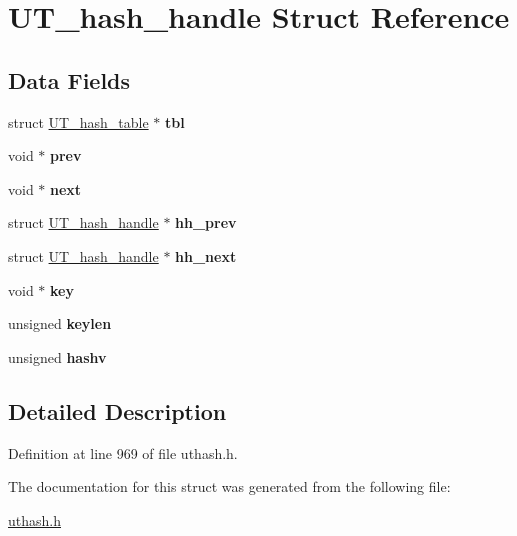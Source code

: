 \hypertarget{struct_u_t__hash__handle}{
\section{UT\_\-hash\_\-handle Struct Reference}
\label{struct_u_t__hash__handle}
}
\subsection*{Data Fields}
\begin{DoxyCompactItemize}
\item 
\hypertarget{struct_u_t__hash__handle_ad2035ee3b2aa55b22e352341372a5e73}{
struct \hyperlink{struct_u_t__hash__table}{UT\_\-hash\_\-table} $\ast$ {\bfseries tbl}}
\label{struct_u_t__hash__handle_ad2035ee3b2aa55b22e352341372a5e73}

\item 
\hypertarget{struct_u_t__hash__handle_abaf54a69367933df2d45575f48ca6a58}{
void $\ast$ {\bfseries prev}}
\label{struct_u_t__hash__handle_abaf54a69367933df2d45575f48ca6a58}

\item 
\hypertarget{struct_u_t__hash__handle_a93bc88ffe97f85ea0d9e0056b7118942}{
void $\ast$ {\bfseries next}}
\label{struct_u_t__hash__handle_a93bc88ffe97f85ea0d9e0056b7118942}

\item 
\hypertarget{struct_u_t__hash__handle_a3ec03e34d7975d5c1981c44b324619b2}{
struct \hyperlink{struct_u_t__hash__handle}{UT\_\-hash\_\-handle} $\ast$ {\bfseries hh\_\-prev}}
\label{struct_u_t__hash__handle_a3ec03e34d7975d5c1981c44b324619b2}

\item 
\hypertarget{struct_u_t__hash__handle_a4f6989385499ba6f594b0f0facd28325}{
struct \hyperlink{struct_u_t__hash__handle}{UT\_\-hash\_\-handle} $\ast$ {\bfseries hh\_\-next}}
\label{struct_u_t__hash__handle_a4f6989385499ba6f594b0f0facd28325}

\item 
\hypertarget{struct_u_t__hash__handle_a40690fc15aeaeba8f25385f05f84dd4d}{
void $\ast$ {\bfseries key}}
\label{struct_u_t__hash__handle_a40690fc15aeaeba8f25385f05f84dd4d}

\item 
\hypertarget{struct_u_t__hash__handle_af2abdc405972a6bbdee2ade2c0f346c4}{
unsigned {\bfseries keylen}}
\label{struct_u_t__hash__handle_af2abdc405972a6bbdee2ade2c0f346c4}

\item 
\hypertarget{struct_u_t__hash__handle_aae5e635fa110556e5007f627089f8323}{
unsigned {\bfseries hashv}}
\label{struct_u_t__hash__handle_aae5e635fa110556e5007f627089f8323}

\end{DoxyCompactItemize}


\subsection{Detailed Description}


Definition at line 969 of file uthash.h.



The documentation for this struct was generated from the following file:\begin{DoxyCompactItemize}
\item 
\hyperlink{uthash_8h}{uthash.h}\end{DoxyCompactItemize}

